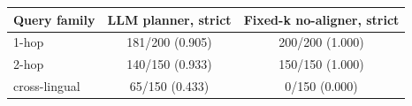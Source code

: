 \begin{tabular}{lcc}
\toprule
Query family & LLM planner, strict & Fixed-k no-aligner, strict \\
\midrule
1-hop & 181/200 (0.905) & 200/200 (1.000) \\
2-hop & 140/150 (0.933) & 150/150 (1.000) \\
cross-lingual & 65/150 (0.433) & 0/150 (0.000) \\
\bottomrule
\end{tabular}
